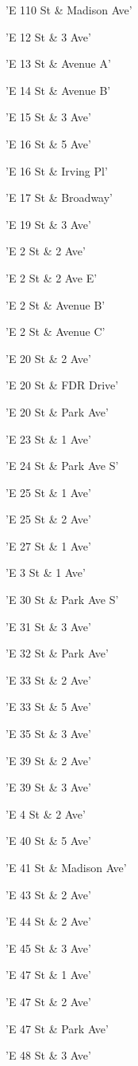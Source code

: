 \documentclass[11pt]{article}
\begin{document}
\begin{enumerate*}
\item 'E 110 St \& Madison Ave'
\item 'E 12 St \& 3 Ave'
\item 'E 13 St \& Avenue A'
\item 'E 14 St \& Avenue B'
\item 'E 15 St \& 3 Ave'
\item 'E 16 St \& 5 Ave'
\item 'E 16 St \& Irving Pl'
\item 'E 17 St \& Broadway'
\item 'E 19 St \& 3 Ave'
\item 'E 2 St \& 2 Ave'
\item 'E 2 St \& 2 Ave E'
\item 'E 2 St \& Avenue B'
\item 'E 2 St \& Avenue C'
\item 'E 20 St \& 2 Ave'
\item 'E 20 St \& FDR Drive'
\item 'E 20 St \& Park Ave'
\item 'E 23 St \& 1 Ave'
\item 'E 24 St \& Park Ave S'
\item 'E 25 St \& 1 Ave'
\item 'E 25 St \& 2 Ave'
\item 'E 27 St \& 1 Ave'
\item 'E 3 St \& 1 Ave'
\item 'E 30 St \& Park Ave S'
\item 'E 31 St \& 3 Ave'
\item 'E 32 St \& Park Ave'
\item 'E 33 St \& 2 Ave'
\item 'E 33 St \& 5 Ave'
\item 'E 35 St \& 3 Ave'
\item 'E 39 St \& 2 Ave'
\item 'E 39 St \& 3 Ave'
\item 'E 4 St \& 2 Ave'
\item 'E 40 St \& 5 Ave'
\item 'E 41 St \& Madison Ave'
\item 'E 43 St \& 2 Ave'
\item 'E 44 St \& 2 Ave'
\item 'E 45 St \& 3 Ave'
\item 'E 47 St \& 1 Ave'
\item 'E 47 St \& 2 Ave'
\item 'E 47 St \& Park Ave'
\item 'E 48 St \& 3 Ave'

\end{enumerate*}
\end{document}
